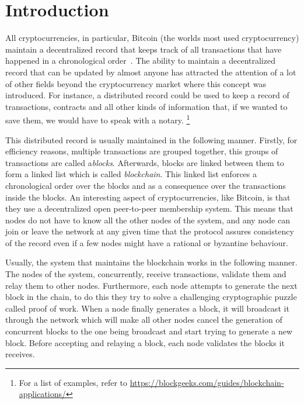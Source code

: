 \documentclass{dads}   %
\begin{document}
\section{Introduction}
All cryptocurrencies, in particular, Bitcoin (the worlds most used cryptocurrency) maintain a decentralized record that keeps track of all transactions that have happened in a chronological order~\cite{nakamoto2008bitcoin}. The ability to maintain a decentralized record that can be updated by almost anyone has attracted the attention of a lot of other fields beyond the cryptocurrency market where this concept was introduced. For instance, a distributed record could be used to keep a record of transactions, contracts and all other kinds of information that, if we wanted to save them, we would have to speak with a notary. \footnote{For a list of examples, refer to \url{https://blockgeeks.com/guides/blockchain-applications/}}

This distributed record is usually maintained in the following manner.  Firstly, for efficiency reasons, multiple transactions are grouped together, this groups of transactions are called a\textit{blocks}. Afterwards, blocks are linked between them to form a linked list which is called \textit{blockchain}. This linked list enforces a chronological order over the blocks and as a consequence over the transactions inside the blocks. An interesting aspect of cryptocurrencies, like Bitcoin, is that they use a decentralized open peer-to-peer membership system. This means that nodes do not have to know all the other nodes of the system, and any node can join or leave the network at any given time that the protocol assures consistency of the record even if a few nodes might have a rational or byzantine behaviour.

Usually, the system that maintains the blockchain works in the following manner. The nodes of the system, concurrently, receive transactions, validate them and relay them to other nodes. Furthermore, each node attempts to generate the next block in the chain, to do this they try to solve a challenging cryptographic puzzle called proof of work. When a node finally generates a block, it will broadcast it through the network which will make all other nodes cancel the generation of concurrent blocks to the one being broadcast and start trying to generate a new block. Before accepting and relaying a block, each node validates the blocks it receives.
\end{document}
